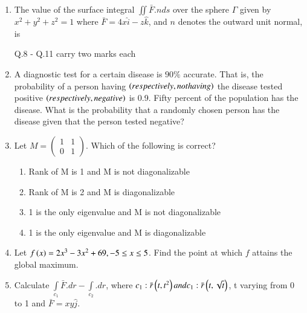 \documentclass[journal]{IEEEtran}
\begin{document}
\begin{enumerate}[start=4]
\begin{enumerate}
\end{enumerate}
\item %
The value  of the surface integral $\iint \bar{F} . n ds$ over the sphere $\Gamma$ given by $x^2+y^2+z^2=1$ where $\bar{F}=4x\hat{i}-z\hat{k} $, and $n$ denotes the outward unit normal, is 
\begin{enumerate}
\end{enumerate}
Q.8 - Q.11 carry two marks each
\item %
A diagnostic test for a certain disease is $90 \%$ accurate. That is, the probability of a person having $\left(respectively,not having\right)$ the disease tested positive $\left(respectively, negative\right)$ is 0.9. Fifty percent of the population has the disease. What is the probability that a randomly chosen person has the disease given that the person tested negative?
\item %
Let $M = \begin{pmatrix}
1 & 1 \\ 0 & 1  
\end{pmatrix} $. Which of the following is correct?
\begin{enumerate}
\item Rank of M is 1 and M is not diagonalizable
\item Rank of M is 2 and M is diagonalizable
\item 1 is the only eigenvalue and M is not diagonalizable
\item 1 is the only eigenvalue and M is diagonalizable
\end{enumerate}
\item %
Let $f\left(x\right)=2x^3-3x^2+69, -5\leq x \leq 5$. Find the point at which $f$ attains the global maximum.
\item %
Calculate $\int\limits_{c_{1}} \bar{F}.dr - \int\limits_{c_{2}}.dr$, where $c_1 : \bar{r}\left(t,t^2\right) and c_1 : \bar{r}\left(t,\sqrt{t}\right)$, t varying from 0 to 1 and $\bar{F}=xy\hat{j}$.
\end{enumerate}
\end{document}
